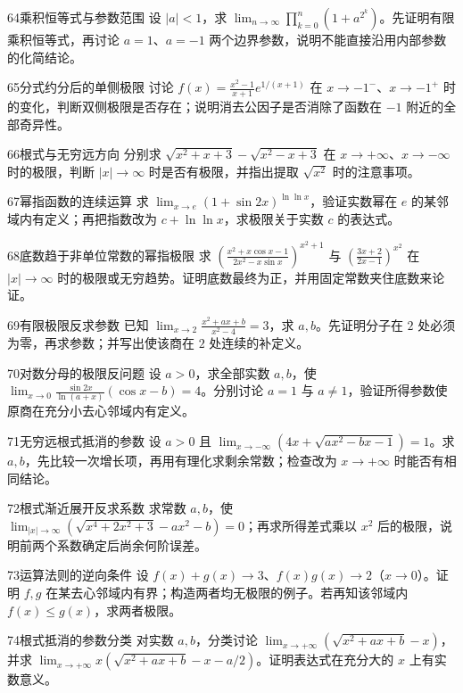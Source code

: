\begin{exercise}{64}{乘积恒等式与参数范围}
设 $|a|<1$，求 $\lim_{n\to\infty}\prod_{k=0}^n(1+a^{2^k})$。先证明有限乘积恒等式，再讨论 $a=1$、$a=-1$ 两个边界参数，说明不能直接沿用内部参数的化简结论。
\end{exercise}
\begin{exercise}{65}{分式约分后的单侧极限}
讨论 $f(x)=\frac{x^2-1}{x+1}e^{1/(x+1)}$ 在 $x\to-1^-$、$x\to-1^+$ 时的变化，判断双侧极限是否存在；说明消去公因子是否消除了函数在 $-1$ 附近的全部奇异性。
\end{exercise}
\begin{exercise}{66}{根式与无穷远方向}
分别求 $\sqrt{x^2+x+3}-\sqrt{x^2-x+3}$ 在 $x\to+\infty$、$x\to-\infty$ 时的极限，判断 $|x|\to\infty$ 时是否有极限，并指出提取 $\sqrt{x^2}$ 时的注意事项。
\end{exercise}
\begin{exercise}{67}{幂指函数的连续运算}
求 $\lim_{x\to e}(1+\sin2x)^{\ln\ln x}$，验证实数幂在 $e$ 的某邻域内有定义；再把指数改为 $c+\ln\ln x$，求极限关于实数 $c$ 的表达式。
\end{exercise}
\begin{exercise}{68}{底数趋于非单位常数的幂指极限}
求 $\left(\frac{x^2+x\cos x-1}{2x^2-x\sin x}\right)^{x^2+1}$ 与 $\left(\frac{3x+2}{2x-1}\right)^{x^2}$ 在 $|x|\to\infty$ 时的极限或无穷趋势。证明底数最终为正，并用固定常数夹住底数来论证。
\end{exercise}
\begin{exercise}{69}{有限极限反求参数}
已知 $\lim_{x\to2}\frac{x^2+ax+b}{x^2-4}=3$，求 $a,b$。先证明分子在 $2$ 处必须为零，再求参数；并写出使该商在 $2$ 处连续的补定义。
\end{exercise}
\begin{exercise}{70}{对数分母的极限反问题}
设 $a>0$，求全部实数 $a,b$，使 $\lim_{x\to0}\frac{\sin2x}{\ln(a+x)}(\cos x-b)=4$。分别讨论 $a=1$ 与 $a\ne1$，验证所得参数使原商在充分小去心邻域内有定义。
\end{exercise}
\begin{exercise}{71}{无穷远根式抵消的参数}
设 $a>0$ 且 $\lim_{x\to-\infty}(4x+\sqrt{ax^2-bx-1})=1$。求 $a,b$，先比较一次增长项，再用有理化求剩余常数；检查改为 $x\to+\infty$ 时能否有相同结论。
\end{exercise}
\begin{exercise}{72}{根式渐近展开反求系数}
求常数 $a,b$，使 $\lim_{|x|\to\infty}(\sqrt{x^4+2x^2+3}-ax^2-b)=0$；再求所得差式乘以 $x^2$ 后的极限，说明前两个系数确定后尚余何阶误差。
\end{exercise}
\begin{exercise}{73}{运算法则的逆向条件}
设 $f(x)+g(x)\to3$、$f(x)g(x)\to2$（$x\to0$）。证明 $f,g$ 在某去心邻域内有界；构造两者均无极限的例子。若再知该邻域内 $f(x)\le g(x)$，求两者极限。
\end{exercise}
\begin{exercise}{74}{根式抵消的参数分类}
对实数 $a,b$，分类讨论 $\lim_{x\to+\infty}(\sqrt{x^2+ax+b}-x)$，并求 $\lim_{x\to+\infty}x(\sqrt{x^2+ax+b}-x-a/2)$。证明表达式在充分大的 $x$ 上有实数意义。
\end{exercise}
